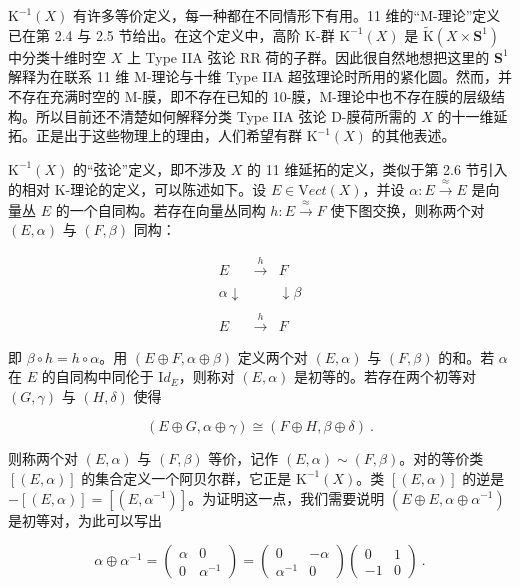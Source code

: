 \documentclass[11pt,a4paper]{ctexart}
\begin{document}
\({\mathrm K}^{-1}(X)\) 有许多等价定义，每一种都在不同情形下有用。11 维的``M-理论''定义已在第 2.4 与 2.5 节给出。在这个定义中，高阶 K-群 \({\mathrm K}^{-1}(X)\) 是 \(\widetilde{{\mathrm K}}(X\times {\mathbf S}^1)\) 中分类十维时空 \(X\) 上 Type IIA 弦论 RR 荷的子群。因此很自然地想把这里的 \({\mathbf S}^1\) 解释为在联系 11 维 M-理论与十维 Type IIA 超弦理论时所用的紧化圆。然而，并不存在充满时空的 M-膜，即不存在已知的 10-膜，M-理论中也不存在膜的层级结构。所以目前还不清楚如何解释分类 Type IIA 弦论 D-膜荷所需的 \(X\) 的十一维延拓。正是出于这些物理上的理由，人们希望有群 \({\mathrm K}^{-1}(X)\) 的其他表述。

\({\mathrm K}^{-1}(X)\) 的``弦论''定义，即不涉及 \(X\) 的 11 维延拓的定义，类似于第 2.6 节引入的相对 K-理论的定义，可以陈述如下。设 \(E\in{\mathrm Vect}(X)\)，并设 \(\alpha: E\stackrel{\approx}{\longrightarrow} E\) 是向量丛 \(E\) 的一个自同构。若存在向量丛同构 \(h:E\stackrel{\approx}{\longrightarrow} F\) 使下图交换，则称两个对 \((E,\alpha)\) 与 \((F,\beta)\) 同构：

\[{\begin{array}{ccc}
E&\stackrel{h}{\longrightarrow}&F\\&
&\\{\scriptstyle\alpha}\downarrow& &\downarrow{\scriptstyle\beta}\\&
&\\E&\stackrel{h}{\longrightarrow}&F\end{array}}\]

即 \(\beta\circ h=h\circ\alpha\)。用 \((E\oplus F, \alpha\oplus\beta)\) 定义两个对 \((E,\alpha)\) 与 \((F,\beta)\) 的和。若 \(\alpha\) 在 \(E\) 的自同构中同伦于 \({\mathrm Id}_{E}\)，则称对 \((E,\alpha)\) 是初等的。若存在两个初等对 \((G,\gamma)\) 与 \((H,\delta)\) 使得

\[(E\oplus G,\alpha\oplus\gamma)\cong
(F\oplus H, \beta\oplus\delta)\ .\]

则称两个对 \((E,\alpha)\) 与 \((F,\beta)\) 等价，记作 \((E,\alpha) \sim (F,\beta)\)。对的等价类 \([(E,\alpha)]\) 的集合定义一个阿贝尔群，它正是 \({\mathrm K}^{-1}(X)\)。类 \([(E,\alpha)]\) 的逆是 \(-[(E,\alpha)]=[(E,\alpha^{-1})]\)。为证明这一点，我们需要说明 \((E\oplus E,\alpha\oplus\alpha^{-1})\) 是初等对，为此可以写出

\[\alpha\oplus\alpha^{-1}=\left( \begin{array}{cc}\alpha & 0\\
0&\alpha^{-1}\end{array}\right)=
\left(\begin{array}{cc}0 & -\alpha\\ \alpha^{-1}&0
\end{array}\right)
\left(\begin{array}{cc}0 & 1\\ -1&0\end{array}\right)\ .\]
\end{document}
